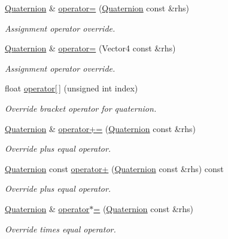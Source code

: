 \begin{DoxyCompactItemize}
\hyperlink{structMathUtil_1_1Quaternion}{Quaternion} \& \hyperlink{structMathUtil_1_1Quaternion_a0db72410da8c9e488a6b32694d2e56df}{operator=} (\hyperlink{structMathUtil_1_1Quaternion}{Quaternion} const \&rhs)
\begin{DoxyCompactList}\small\item\em Assignment operator override. \end{DoxyCompactList}\item 
\hyperlink{structMathUtil_1_1Quaternion}{Quaternion} \& \hyperlink{structMathUtil_1_1Quaternion_a1267584036a5e73bcc1b72bdee59861a}{operator=} (Vector4 const \&rhs)
\begin{DoxyCompactList}\small\item\em Assignment operator override. \end{DoxyCompactList}\item 
float \hyperlink{structMathUtil_1_1Quaternion_a501426c95a2a54a1cbc9cb5a7da17e70}{operator\mbox{[}$\,$\mbox{]}} (unsigned int index)
\begin{DoxyCompactList}\small\item\em Override bracket operator for quaternion. \end{DoxyCompactList}\item 
\hyperlink{structMathUtil_1_1Quaternion}{Quaternion} \& \hyperlink{structMathUtil_1_1Quaternion_aae4976a202e56ca8602c64a5d97fafb8}{operator+=} (\hyperlink{structMathUtil_1_1Quaternion}{Quaternion} const \&rhs)
\begin{DoxyCompactList}\small\item\em Override plus equal operator. \end{DoxyCompactList}\item 
\hyperlink{structMathUtil_1_1Quaternion}{Quaternion} const \hyperlink{structMathUtil_1_1Quaternion_a339741f5707630e1914494ceb389aeeb}{operator+} (\hyperlink{structMathUtil_1_1Quaternion}{Quaternion} const \&rhs) const
\begin{DoxyCompactList}\small\item\em Override plus equal operator. \end{DoxyCompactList}\item 
\hyperlink{structMathUtil_1_1Quaternion}{Quaternion} \& \hyperlink{structMathUtil_1_1Quaternion_afc522c18afb72f8f63178d5b55ba963a}{operator$\ast$=} (\hyperlink{structMathUtil_1_1Quaternion}{Quaternion} const \&rhs)
\begin{DoxyCompactList}\small\item\em Override times equal operator. \end{DoxyCompactList}\item 

\end{DoxyCompactItemize}
